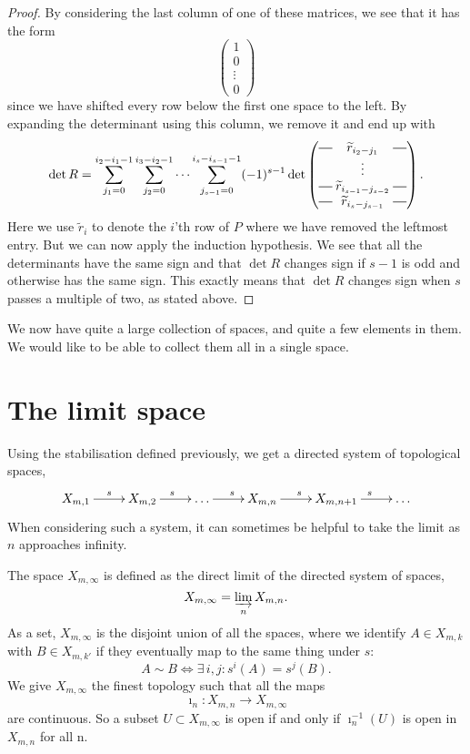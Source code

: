 \begin{proof}
  By considering the last column of one of these matrices, we see that
  it has the form
  \[
  \begin{pmatrix}
    1 \\
    0 \\
    \vdots \\
    0
  \end{pmatrix} \]
  since we have shifted every row below the first one space to the
  left. By expanding the determinant using this column, we remove it and
  end up with
  \[ \det R = \sum_{j_1 = 0}^{i_2-i_1-1}\sum_{j_2 = 0}^{i_3-i_2-1}
  \dots \sum_{j_{s-1}=0}^{i_s-i_{s-1}-1} (-1)^{s-1} \det
  \begin{pmatrix}
    \matrow{\widetilde{r}_{i_2-j_1}} \\
    & \hspace{-0.75em} \vdots & \\
    \matrow{\widetilde{r}_{i_{s-1}-j_{s-2}}} \\
    \matrow{\widetilde{r}_{i_s-j_{s-1}}}
  \end{pmatrix}. \]
  Here we use $\widetilde{r}_i$ to denote the $i$'th row of $P$ where we
  have removed the leftmost entry. But we can now apply the induction
  hypothesis. We see that all the determinants have the same sign and
  that $\det R$ changes sign if $s-1$ is odd and otherwise has the
  same sign. This exactly means that $\det R$ changes sign
  when $s$ passes a multiple of two, as stated above. 
\end{proof}

We now have quite a large collection of spaces, and quite a few
elements in them. We would like to be able to collect them all in a
single space. 

\section{The limit space}
\label{sec:rum-gr}

Using the stabilisation defined previously, we get a directed system
of topological spaces,
\[ \xymatrix{X_{m,1} \ar[r]^s & X_{m,2} \ar[r]^s & \dots \ar[r]^s &
  X_{m,n} \ar[r]^s & X_{m,n+1} \ar[r]^s & \dots } \]
When considering such a system, it can sometimes be helpful to
take the limit as $n$ approaches infinity.

\begin{definition}
  The space $X_{m,\infty}$ is defined as the direct limit of the
  directed system of spaces,
  \[ X_{m,\infty} = \varinjlim_n X_{m,n}. \]
  As a set, $X_{m,\infty}$ is the disjoint union of all the spaces,
  where we identify $A \in X_{m,k}$ with $B \in X_{m,k'}$ if they
  eventually map to the same thing under $s$:
  \[ A \sim B \iff \exists\, i,j : s^i(A) = s^j(B). \]
  We give $X_{m,\infty}$ the finest topology such that all the
  maps 
  \[ \imath_n : X_{m,n} \to X_{m,\infty} \]
  are continuous. So a subset $U \subset X_{m,\infty}$ is open if and
  only if $\imath_n^{-1}(U)$ is open in $X_{m,n}$ for all n. 
\end{definition}

